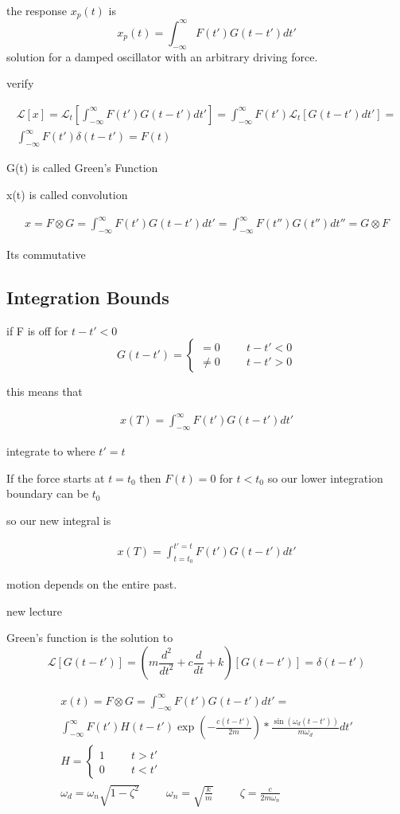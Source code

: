 \documentclass[fleqn]{report}
\newcommand{\hp}{\hspace{1cm}}
\newcommand{\equations} [1] {
\begin{gather*}
#1
\end{gather*}
}
\begin{document}
the response $x_p(t)$ is 
\[
x_p(t) = \int^{\infty}_{- \infty} F(t') G(t - t') dt'
\]
solution for a damped oscillator with an arbitrary driving force. 

verify 
\equations{
    \mathcal L[x] = 
    \mathcal L_t \left[
        \int^{\infty}_{- \infty} F(t') G(t - t') dt'
    \right]
    =
    \int^{\infty}_{- \infty} F(t') \mathcal L_t 
    \left[ 
        G(t - t') dt' 
    \right]
    =
    \\
    \int^{\infty}_{- \infty} F(t') \delta(t - t') = F(t)
}

G(t) is called Green's Function 

x(t) is called convolution 

\equations{
    x = F \otimes G = 
    \int^{\infty}_{- \infty} F(t') G(t - t') dt'
    =
    \int^{\infty}_{- \infty} F(t'') G(t'') dt''
    =
    G \otimes F
}
Its commutative

\subsection{Integration Bounds}
if F is off for $t - t' < 0$
\[
G(t - t') = \begin{cases}
    = 0 \hp t - t' < 0 \\
    \neq 0 \hp t - t' > 0
\end{cases}
\]

this means that 
\equations{
    x(T) = \int^{\infty}_{- \infty} F(t') G(t - t') dt' 
}
integrate to where $t' = t$

If the force starts at $t = t_0$ then $F(t) = 0$ for $t < t_0$
so our lower integration boundary can be $t_0$

so our new integral is 
\equations{
    x(T) = \int^{t' = t}_{t = t_0} F(t') G(t - t') dt' 
}

motion depends on the entire past. 

new lecture

Green's function is the solution to 
\[
\mathcal L[G(t - t')] =
\left(
    m \frac{d^2}{dt^2} + c \frac{d}{dt} + k 
\right) 
[G(t - t')]
=
\delta(t - t')
\]

\equations{
    x(t) = F \otimes G =
     \int^{\infty}_{-\infty}
    F(t') G(t - t') dt'
    =
    \\
    \int^{\infty}_{-\infty}
    F(t') H(t - t') \exp({- \frac{c (t - t')}{2m}})
    *
    \frac{\sin(\omega_d (t - t'))}{m \omega_d}
    dt'
    \\
    H = \begin{cases}
        1 \hp t > t' \\
        0 \hp t < t'
    \end{cases}
    \\
    \omega_d = \omega_n \sqrt{1 - \zeta^2}
    \hp 
    \omega_n = \sqrt{\frac{k}{m}}
    \hp 
    \zeta = \frac{c}{2m \omega_n}
}
\end{document}
